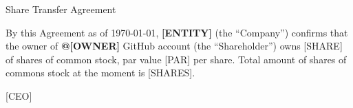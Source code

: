 \documentclass[12pt,letterpaper,oneside]{article}
\begin{document}
Share Transfer Agreement

By this Agreement as of \today,
\textbf{[ENTITY]} (the ``Company'') confirms that
the owner of \textbf{@[OWNER]} GitHub account (the ``Shareholder'')
owns [SHARE] of shares of common stock, par value [PAR] per share.
Total amount of shares of commons stock at the moment is [SHARES].

[CEO]
\end{document}
